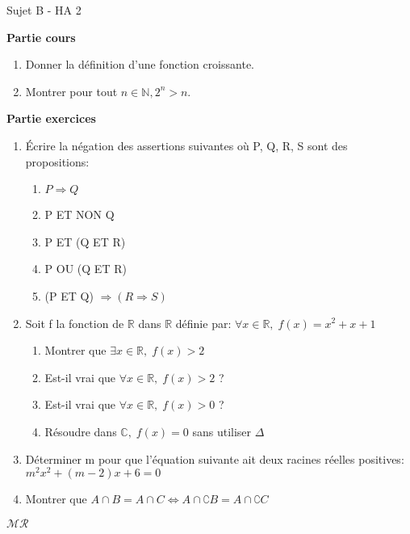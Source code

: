 \documentclass[a4paper,11pt, landscape]{article}
\begin{document}
\begin{multicols*}{3}
\vfill\null
\columnbreak
\centerline{Sujet B - HA 2}

\begin{flushleft}
  \textbf{Partie cours} 
\end{flushleft} 
\begin{enumerate}
  \item Donner la définition d'une fonction croissante.
  \item Montrer pour tout $n \in \mathbb{N}, 2^n > n$.
\end{enumerate}
\textbf{Partie exercices}
\begin{enumerate}
  \item Écrire la négation des assertions suivantes où P, Q, R, S sont des propositions:
  \begin{enumerate}
    \item $P \Rightarrow Q$
    \item P ET NON Q
    \item P ET (Q ET R)
    \item P OU (Q ET R)
    \item (P ET Q) $\Rightarrow (R \Rightarrow S)$ 
  \end{enumerate}
  \item Soit f la fonction de $\mathbb{R}$ dans $\mathbb{R}$ définie par: $\forall x \in \mathbb{R}, \; f(x) = x^2+x+1$
  \begin{enumerate}
    \item Montrer que $\exists x \in \mathbb{R}, \; f(x) > 2$
    \item Est-il vrai que $\forall x \in \mathbb{R}, \; f(x) > 2$ ?
    \item Est-il vrai que $\forall x \in \mathbb{R}, \; f(x) > 0$ ?
    \item Résoudre dans $\mathbb{C}, \; f(x) = 0$ sans utiliser $\Delta$ 
  \end{enumerate}
  \item Déterminer m pour que l'équation suivante ait deux racines réelles positives: $m^2x^2 + (m-2)x + 6 = 0$
  \item Montrer que $A \cap B = A \cap C \Leftrightarrow A \cap \complement{B} = A \cap \complement{C}$
\end{enumerate}
\centerline{$\mathcal{MR}$}


\end{multicols*}
\end{document}
